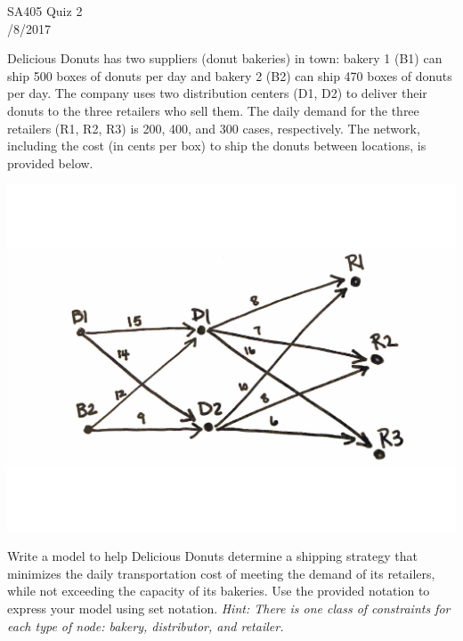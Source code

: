 \documentclass[10pt]{article}
\begin{document}
\begin{center}
  {\sc SA405 Quiz 2}\\
  {/8/2017}
\end{center}

\medskip

Delicious Donuts has two suppliers (donut bakeries) in town: bakery 1 (B1) can ship 500 boxes of donuts per day and bakery 2 (B2) can ship 470 boxes of donuts per day.  The company uses two distribution centers (D1, D2) to deliver their donuts to the three retailers who sell them.  The daily demand for the three retailers (R1, R2, R3) is 200, 400, and 300 cases, respectively.  The network, including the cost (in cents per box) to ship the donuts between locations, is provided below.

\vspace{-.6in}
\begin{center}
\includegraphics[width=.6\textwidth]{DDnetwork}
\end{center}
%
\vspace{-.6in}
Write a model to help Delicious Donuts determine a shipping strategy that minimizes the daily transportation cost of meeting the demand of its retailers, while not exceeding the capacity of its bakeries.  Use the provided notation to express your model using set notation.  \emph{Hint:  There is one class of constraints for each type of node: bakery, distributor, and retailer.}
\end{document}
